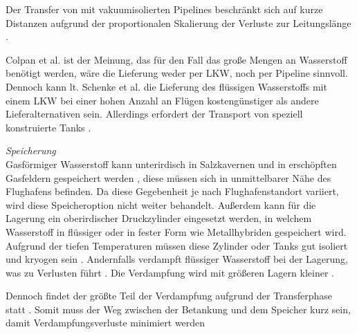 Der Transfer von  mit vakuumisolierten Pipelines beschränkt sich auf kurze Distanzen
aufgrund der proportionalen Skalierung der Verluste zur Leitungslänge \cite{colpan2022fuel}.

Colpan et al.\cite{colpan2022fuel} ist der Meinung, 
das für den Fall das große Mengen an Wasserstoff benötigt werden, 
wäre die Lieferung weder per LKW, noch per Pipeline sinnvoll. 
%
Dennoch kann lt. Schenke et al. \cite{schenke2024lh2} die Lieferung des flüssigen Wasserstoffs 
mit einem LKW bei einer hohen Anzahl an Flügen kostengünstiger als andere Lieferalternativen sein.
Allerdings erfordert der Transport von  speziell konstruierte Tanks \cite{mulder2019outlook}.

%

\textit{Speicherung}\\
Gasförmiger Wasserstoff kann unterirdisch in Salzkavernen 
und in erschöpften Gasfeldern gespeichert werden \cite{undertaking2022strategic}, 
diese müssen sich in unmittelbarer Nähe des Flughafens befinden. 
Da diese Gegebenheit je nach Flughafenstandort variiert, 
wird diese Speicheroption nicht weiter behandelt.
Außerdem kann für die Lagerung ein oberirdischer Druckzylinder eingesetzt werden, 
in welchem Wasserstoff in flüssiger oder in fester Form wie Metallhybriden gespeichert wird.
Aufgrund der tiefen Temperaturen müssen diese Zylinder oder Tanks gut isoliert und kryogen sein \cite{undertaking2022strategic}.
Andernfalls verdampft flüssiger Wasserstoff bei der Lagerung, 
was zu Verlusten führt \cite{undertaking2022strategic}. 
Die Verdampfung wird mit größeren Lagern kleiner \cite{colpan2022fuel}.

Dennoch findet der größte Teil der Verdampfung aufgrund 
der Transferphase statt \cite{undertaking2022strategic}.
Somit muss der Weg zwischen der Betankung und dem Speicher kurz sein, 
damit Verdampfungsverluste minimiert werden \cite{colpan2022fuel}

